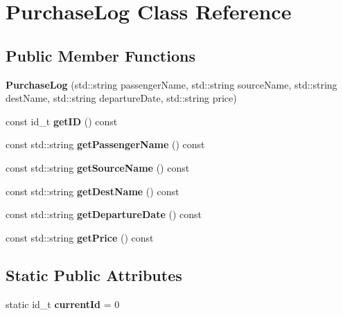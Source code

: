 \hypertarget{classPurchaseLog}{}\section{Purchase\+Log Class Reference}
\label{classPurchaseLog}
\subsection*{Public Member Functions}
\begin{DoxyCompactItemize}
\item 
\mbox{\label{classPurchaseLog_a506a4e57eb23f36769c5dee6a4ec6fa0}} 
{\bfseries Purchase\+Log} (std\+::string passenger\+Name, std\+::string source\+Name, std\+::string dest\+Name, std\+::string departure\+Date, std\+::string price)
\item 
\mbox{\label{classPurchaseLog_a0320e9136e01de2a9652db55c1739d6f}} 
const id\+\_\+t {\bfseries get\+ID} () const
\item 
\mbox{\label{classPurchaseLog_a53f354f530d3179139eff0dbcf7aa67b}} 
const std\+::string {\bfseries get\+Passenger\+Name} () const
\item 
\mbox{\label{classPurchaseLog_a5c994361a33f18ad521a2af034a6cd8f}} 
const std\+::string {\bfseries get\+Source\+Name} () const
\item 
\mbox{\label{classPurchaseLog_a1ced321455e51202b4fbc962a2ab4398}} 
const std\+::string {\bfseries get\+Dest\+Name} () const
\item 
\mbox{\label{classPurchaseLog_a55fd3400a7c03a09a276bfc015f75415}} 
const std\+::string {\bfseries get\+Departure\+Date} () const
\item 
\mbox{\label{classPurchaseLog_a5fc1010f824f9ce26c309f9682d1b5ff}} 
const std\+::string {\bfseries get\+Price} () const
\end{DoxyCompactItemize}
\subsection*{Static Public Attributes}
\begin{DoxyCompactItemize}
\item 
\mbox{\label{classPurchaseLog_a175b76f4fd112806badc0ea294bccca5}} 
static id\+\_\+t {\bfseries current\+Id} = 0
\end{DoxyCompactItemize}
